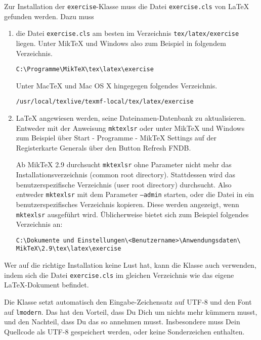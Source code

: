 \documentclass{exercise}
\begin{document}
    Zur Installation der \texttt{exercise}-Klasse muss die Datei
    \texttt{exercise.cls} von \LaTeX{} gefunden werden. Dazu muss
    \begin{enumerate}[1)]
      \item die Datei \texttt{exercise.cls} am besten im Verzeichnis
        \texttt{tex/latex/exercise}
        liegen. Unter MikTeX und Windows also zum Beispiel in folgendem Verzeichnis.

        \texttt{C:\textbackslash{}Programme\textbackslash{}MikTeX\textbackslash{}tex\textbackslash{}latex\textbackslash{}exercise}

        Unter MacTeX und Mac OS X hingegegen folgendes Verzeichnis.

        \texttt{/usr/local/texlive/texmf-local/tex/latex/exercise}

      \item \LaTeX{} angewiesen werden, seine Dateinamen-Datenbank zu aktualisieren.
        Entweder mit der Anweisung \texttt{mktexlsr} oder unter MikTeX und Windows
        zum Beispiel über \textsf{Start - Programme - MikTeX Settings} auf der
        Registerkarte \textsf{Generals} über den Button \textsf{Refresh FNDB}.

      Ab MikTeX 2.9 durchsucht \texttt{mktexlsr} ohne Parameter nicht mehr das
      Installationsverzeichnis (common root directory). Stattdessen wird
      das benutzerspezifische Verzeichnis (user root directory) durchsucht. Also
      entweder \texttt{mktexlsr} mit dem Parameter \texttt{--admin} starten,
      oder die Datei in ein benutzerspezifisches Verzeichnis kopieren. Diese
      werden angezeigt, wenn \texttt{mktexlsr} ausgeführt wird. Üblicherweise
      bietet sich zum Beispiel folgendes Verzeichnis an:

      \texttt{C:\textbackslash{}Dokumente und Einstellungen\textbackslash{}<Benutzername>\textbackslash{}Anwendungsdaten\textbackslash{}\\
      MikTeX\textbackslash{}2.9\textbackslash{}tex\textbackslash{}latex\textbackslash{}exercise}

    \end{enumerate}

    Wer auf die richtige Installation keine Lust hat, kann die Klasse
    auch verwenden, indem sich die Datei \texttt{exercise.cls} im gleichen
    Verzeichnis wie das eigene \LaTeX{}-Dokument befindet.

    Die Klasse setzt automatisch den Eingabe-Zeichensatz auf UTF-8 und den Font
    auf \texttt{lmodern}. Das hat den Vorteil, dass Du Dich um nichts mehr
    kümmern musst, und den Nachteil, dass Du das so annehmen musst. Insbesondere
    muss Dein Quellcode als UTF-8 gespeichert werden, oder keine
    Sonderzeichen enthalten.
\end{document}
